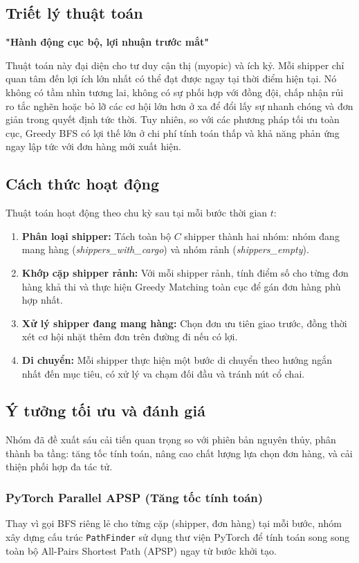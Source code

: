 \documentclass[conference]{IEEEtran}
\begin{document}
\subsection{Triết lý thuật toán}
\begin{center}
    \textbf{"Hành động cục bộ, lợi nhuận trước mắt"}
\end{center}
 
Thuật toán này đại diện cho tư duy cận thị (myopic) và ích kỷ. Mỗi shipper chỉ quan tâm đến lợi ích lớn nhất có thể đạt được ngay tại thời điểm hiện tại. Nó không có tầm nhìn tương lai, không có sự phối hợp với đồng đội, chấp nhận rủi ro tắc nghẽn hoặc bỏ lỡ các cơ hội lớn hơn ở xa để đổi lấy sự nhanh chóng và đơn giản trong quyết định tức thời. Tuy nhiên, so với các phương pháp tối ưu toàn cục, Greedy BFS có lợi thế lớn ở chi phí tính toán thấp và khả năng phản ứng ngay lập tức với đơn hàng mới xuất hiện.
 
\subsection{Cách thức hoạt động}
Thuật toán hoạt động theo chu kỳ sau tại mỗi bước thời gian $t$:
\begin{enumerate}
    \item \textbf{Phân loại shipper:} Tách toàn bộ $C$ shipper thành hai nhóm: nhóm đang mang hàng (\textit{shippers\_with\_cargo}) và nhóm rảnh (\textit{shippers\_empty}).
    \item \textbf{Khớp cặp shipper rảnh:} Với mỗi shipper rảnh, tính điểm số cho từng đơn hàng khả thi và thực hiện Greedy Matching toàn cục để gán đơn hàng phù hợp nhất.
    \item \textbf{Xử lý shipper đang mang hàng:} Chọn đơn ưu tiên giao trước, đồng thời xét cơ hội nhặt thêm đơn trên đường đi nếu có lợi.
    \item \textbf{Di chuyển:} Mỗi shipper thực hiện một bước di chuyển theo hướng ngắn nhất đến mục tiêu, có xử lý va chạm đối đầu và tránh nút cổ chai.
\end{enumerate}
 
\subsection{Ý tưởng tối ưu và đánh giá}
Nhóm đã đề xuất sáu cải tiến quan trọng so với phiên bản nguyên thủy, phân thành ba tầng: tăng tốc tính toán, nâng cao chất lượng lựa chọn đơn hàng, và cải thiện phối hợp đa tác tử.
 
\subsubsection{PyTorch Parallel APSP (Tăng tốc tính toán)}
Thay vì gọi BFS riêng lẻ cho từng cặp (shipper, đơn hàng) tại mỗi bước, nhóm xây dựng cấu trúc \texttt{PathFinder} sử dụng thư viện PyTorch để tính toán song song toàn bộ All-Pairs Shortest Path (APSP) ngay từ bước khởi tạo.
 
\end{document}
